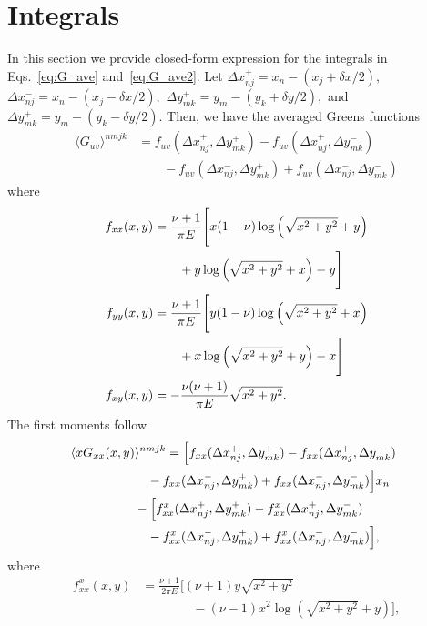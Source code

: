 \documentclass[aps,prl,reprint,twocolumn,groupedaddress,showpacs]{revtex4-1}
\begin{document}
\section{Integrals }
In this section we provide closed-form expression for the integrals in Eqs.~\ref{eq:G_ave} and~\ref{eq:G_ave2}.
Let $\Delta x_{nj}^+ = x_n - (x_j+\delta x/2),$ $\Delta x_{nj}^- = x_n - (x_j-\delta x/2),$ $\Delta y_{mk}^+ = y_m - (y_k+\delta y/2),$ and $\Delta y_{mk}^+ = y_m - (y_k-\delta y/2).$ Then,
we have the averaged Greens functions
\begin{align}
\langle G_{uv}\rangle^{nmjk} &=   f_{uv}( \Delta x_{nj}^+,\Delta y_{mk}^+) - f_{uv}( \Delta x_{nj}^+,\Delta y_{mk}^-)  \nonumber \\
&\qquad -f_{uv}(\Delta x_{nj}^-, \Delta y_{mk}^+) + f_{uv}(\Delta x_{nj}^- , \Delta y_{mk}^-)
\end{align}
where
\begin{align}\allowdisplaybreaks
f_{xx}(x,y) &= \frac{\nu+1}{\pi E}\Bigg[ x(1-\nu ) \log\left( \sqrt{x^2+y^2}+y\right) \nonumber\\
&\qquad+ y \log\left(\sqrt{x^2+y^2} +x\right)-y  \Bigg] \\
f_{yy}(x,y) &= \frac{\nu+1}{\pi E}\Bigg[ y(1-\nu ) \log\left( \sqrt{x^2+y^2}+x\right) \nonumber\\
&\qquad+ x \log\left(\sqrt{x^2+y^2} +y\right)-x  \Bigg] \\
f_{xy}(x,y) &= -\frac{\nu(\nu+1)}{\pi E}\sqrt{x^2+y^2}.
\end{align}
The first moments follow
\begin{align}
\lefteqn{\langle xG_{xx}(x,y) \rangle^{nmjk} =\Big[ f_{xx}( \Delta x_{nj}^+,\Delta y_{mk}^+)- f_{xx}( \Delta x_{nj}^+,\Delta y_{mk}^-)}\nonumber\\
 &\qquad\qquad\qquad   -f_{xx}(\Delta x_{nj}^-, \Delta y_{mk}^+)+ f_{xx}(\Delta x_{nj}^- , \Delta y_{mk}^-)\Big] x_n\nonumber\\
 &\quad\qquad\qquad   - \Big[ f^x_{xx}( \Delta x_{nj}^+ , \Delta y_{mk}^+)- f^x_{xx}( \Delta x_{nj}^+ , \Delta y_{mk}^-) \nonumber\\
 &\qquad\qquad\qquad-f^x_{xx}(\Delta x_{nj}^-, \Delta y_{mk}^+) + f^x_{xx}(\Delta x_{nj}^- , \Delta y_{mk}^-)\Big],
\end{align}
where
\begin{align}
f^x_{xx}(x,y) &= \frac{\nu+1}{2\pi E} \Big[ (\nu+1)y\sqrt{x^2 + y^2} \nonumber\\
&\qquad\qquad- (\nu-1) x^2\log\left(\sqrt{x^2 + y^2} +y  \right)  \Big],
\end{align}
\end{document}
